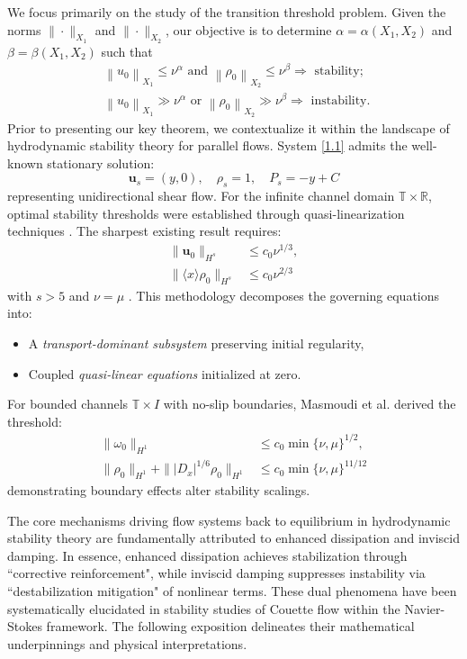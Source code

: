 \documentclass[final, 12pt,reqno]{amsart}
\numberwithin{equation}{section}
\begin{document}
We focus primarily on the study of the transition threshold problem.
Given the norms $\|\cdot\|_{X_1}$ and $\|\cdot\|_{X_2}$, our objective is to determine $\alpha=\alpha\left(X_1, X_2\right)$ and $\beta=\beta\left(X_1, X_2\right)$ such that
$$
\begin{aligned}
& \left\|u_0\right\|_{X_1} \leq \nu^\alpha \text { and }\left\|\rho_0\right\|_{X_2} \leq \nu^\beta \Rightarrow \text { stability; } \\
& \left\|u_0\right\|_{X_1} \gg \nu^\alpha \text { or }\left\|\rho_0\right\|_{X_2} \gg \nu^\beta \Rightarrow \text { instability. }
\end{aligned}
$$
Prior to presenting our key theorem, we contextualize it within the landscape of hydrodynamic stability theory for parallel flows. System \eqref{1.1} admits the well-known stationary solution:
\begin{equation}\label{1.6}
\mathbf{u}_s = (y, 0), \quad \rho_s = 1, \quad P_s = -y + C
\end{equation}
representing unidirectional shear flow. For the infinite channel domain $\mathbb{T} \times \mathbb{R}$, optimal stability thresholds were established through quasi-linearization techniques \cite{Bian.2022,Deng.2021,Niu2024,Zillinger.2021,Zillinger.20210101,Zillinger.2023}. The sharpest existing result requires:
\begin{align}
\|\mathbf{u}_0\|_{H^s} &\leq c_0 \nu^{1/3}, \\
\|\langle x \rangle \rho_0\|_{H^s} &\leq c_0 \nu^{2/3}
\end{align}
with $s > 5$ and $\nu = \mu$ \cite{Niu2024}. This methodology decomposes the governing equations into:
\begin{itemize}
\item A \textit{transport-dominant subsystem} preserving initial regularity,
\item Coupled \textit{quasi-linear equations} initialized at zero.
\end{itemize}
For bounded channels $\mathbb{T} \times I$ with no-slip boundaries, Masmoudi et al.\cite{Masmoudi.2023} derived the threshold:
\begin{align}
\|\omega_0\|_{H^1} &\leq c_0 \min\{\nu, \mu\}^{1/2}, \\
\|\rho_0\|_{H^1} + \||D_x|^{1/6} \rho_0\|_{H^1} &\leq c_0 \min\{\nu, \mu\}^{11/12}
\end{align}
demonstrating boundary effects alter stability scalings.

The core mechanisms driving flow systems back to equilibrium in hydrodynamic stability theory are fundamentally attributed to enhanced dissipation and inviscid damping. In essence, enhanced dissipation achieves stabilization through “corrective reinforcement", while inviscid damping suppresses instability via “destabilization mitigation" of nonlinear terms. These dual phenomena have been systematically elucidated in stability studies of Couette flow within the Navier-Stokes framework. The following exposition delineates their mathematical underpinnings and physical interpretations.
\end{document}

